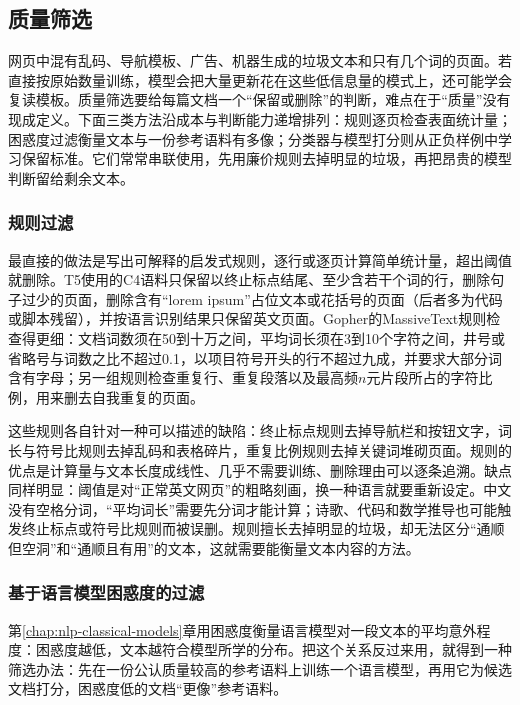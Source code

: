 \subsection{质量筛选}
\label{sec:nlp-llm-data-filtering}

网页中混有乱码、导航模板、广告、机器生成的垃圾文本和只有几个词的页面。若直接按原始数量训练，模型会把大量更新花在这些低信息量的模式上，还可能学会复读模板。质量筛选要给每篇文档一个“保留或删除”的判断，难点在于“质量”没有现成定义。下面三类方法沿成本与判断能力递增排列：规则逐页检查表面统计量；困惑度过滤衡量文本与一份参考语料有多像；分类器与模型打分则从正负样例中学习保留标准。它们常常串联使用，先用廉价规则去掉明显的垃圾，再把昂贵的模型判断留给剩余文本。

\subsubsection{规则过滤}
\label{sec:nlp-llm-data-rule-filter}

最直接的做法是写出可解释的启发式规则，逐行或逐页计算简单统计量，超出阈值就删除。T5使用的C4语料只保留以终止标点结尾、至少含若干个词的行，删除句子过少的页面，删除含有“lorem ipsum”占位文本或花括号的页面（后者多为代码或脚本残留），并按语言识别结果只保留英文页面。Gopher的MassiveText规则检查得更细：文档词数须在50到十万之间，平均词长须在3到10个字符之间，井号或省略号与词数之比不超过0.1，以项目符号开头的行不超过九成，并要求大部分词含有字母；另一组规则检查重复行、重复段落以及最高频$n$元片段所占的字符比例，用来删去自我重复的页面。

这些规则各自针对一种可以描述的缺陷：终止标点规则去掉导航栏和按钮文字，词长与符号比规则去掉乱码和表格碎片，重复比例规则去掉关键词堆砌页面。规则的优点是计算量与文本长度成线性、几乎不需要训练、删除理由可以逐条追溯。缺点同样明显：阈值是对“正常英文网页”的粗略刻画，换一种语言就要重新设定。中文没有空格分词，“平均词长”需要先分词才能计算；诗歌、代码和数学推导也可能触发终止标点或符号比规则而被误删。规则擅长去掉明显的垃圾，却无法区分“通顺但空洞”和“通顺且有用”的文本，这就需要能衡量文本内容的方法。

\subsubsection{基于语言模型困惑度的过滤}
\label{sec:nlp-llm-data-perplexity-filter}

第\ref{chap:nlp-classical-models}章用困惑度衡量语言模型对一段文本的平均意外程度：困惑度越低，文本越符合模型所学的分布。把这个关系反过来用，就得到一种筛选办法：先在一份公认质量较高的参考语料上训练一个语言模型，再用它为候选文档打分，困惑度低的文档“更像”参考语料。


